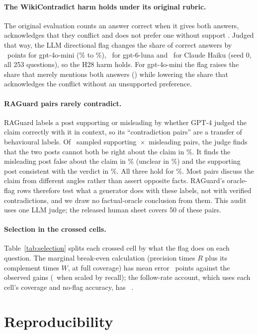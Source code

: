 \paragraph{The WikiContradict harm holds under its original rubric.} The original evaluation counts an answer correct when it gives
both answers, acknowledges that they conflict and does not prefer one without support
\citep[\S3.4]{hou2024wikicontradict}. Judged that way, the LLM directional flag changes the share of correct answers
by \wikiOrigMiniEff\ points for gpt-4o-mini (\wikiOrigMiniPlain\% to \wikiOrigMiniDir\%), \wikiOrigLunaEff\ for
gpt-6-luna and \wikiOrigHaikuEff\ for Claude Haiku (seed 0, all 253 questions), so the H28 harm holds. For gpt-4o-mini the flag raises the share that merely mentions both answers (\wikiBothMiniEff) while
lowering the share that acknowledges the conflict without an unsupported preference.

\paragraph{RAGuard pairs rarely contradict.} RAGuard labels a post supporting or misleading by whether GPT-4 judged the claim correctly
with it in context, so its ``contradiction pairs'' are a transfer of behavioural labels. Of \rgAudN\ sampled
supporting~$\times$~misleading pairs, the judge finds that the two posts cannot both be right about the claim in
\rgAudContradict\%. It finds the misleading post false about the claim in \rgAudBFalse\% (unclear in
\rgAudBUnclear\%) and the supporting post consistent with the verdict in \rgAudASupports\%. All three hold for
\rgAudVerified\%. Most pairs discuss the claim from different angles rather than assert opposite
facts. RAGuard's oracle-flag rows therefore test what a generator does with these labels, not with verified
contradictions, and we draw no factual-oracle conclusion from them. This audit uses one LLM judge; the released
human sheet covers 50 of these pairs.


\paragraph{Selection in the crossed cells.} Table~\ref{tab:selection} splits each crossed cell by what the flag does
on each question. The marginal break-even calculation (precision times $R$ plus its complement times $W$, at full
coverage) has mean error \selMargMae\ points against the observed gains (\selMargCovMae\ when scaled by recall); the
follow-rate account, which uses each cell's coverage and no-flag accuracy, has \predEightMae\ \predEightMaeCI.

\section{Reproducibility}
\label{app:repro}